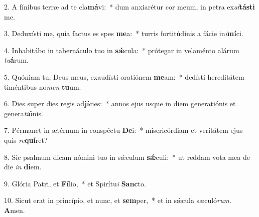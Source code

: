 2. A fínibus terræ ad te cla\textbf{má}vi:~*  dum anxiarétur cor meum, in petra ex\textit{al}\textbf{tás}\textbf{ti} me.\

3. Deduxísti me, quia factus es spes \textbf{me}a:~*  turris fortitúdinis a fácie in\textit{i}\textbf{mí}ci.\

4. Inhabitábo in tabernáculo tuo in \textbf{sǽ}cula:~*  prótegar in velaménto alárum \textit{tu}\textbf{á}rum.\

5. Quóniam tu, Deus meus, exaudísti oratiónem \textbf{me}am:~*  dedísti hereditátem timéntibus no\textit{men} \textbf{tu}um.\

6. Dies super dies regis ad\textbf{jí}cies:~*  annos ejus usque in diem generatiónis et genera\textit{ti}\textbf{ó}nis.\

7. Pérmanet in ætérnum in conspéctu \textbf{De}i:~*  misericórdiam et veritátem ejus quis \textit{re}\textbf{quí}ret?\

8. Sic psalmum dicam nómini tuo in sǽculum \textbf{sǽ}culi:~*  ut reddam vota mea de die \textit{in} \textbf{di}em.\

9. Glória Patri, et \textbf{Fí}lio,~*  et Spirítu\textit{i} \textbf{Sanc}to.\

10. Sicut erat in princípio, et nunc, et \textbf{sem}per,~*  et in sǽcula sæculó\textit{rum}. \textbf{A}men.\

